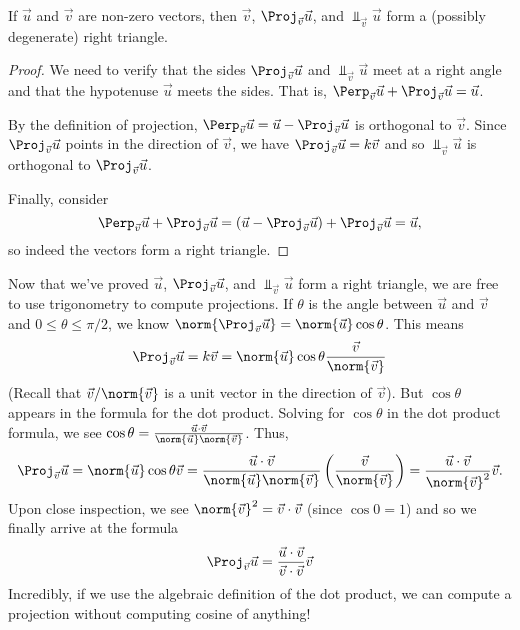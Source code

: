 \begin{theorem}
	If $\vec u$ and $\vec v$ are non-zero vectors, then $\vec v$, $\Proj_{\vec v}\vec u$,
	and $\Perp_{\vec v}\vec u$ form a (possibly degenerate) right triangle.
\end{theorem}
\begin{proof}
	We need to verify that the sides $\Proj_{\vec v}\vec u$ and $\Perp_{\vec v}\vec u$
	meet at a right angle and that the hypotenuse $\vec u$ meets the sides.  That is,
	$\Perp_{\vec v}\vec u+\Proj_{\vec v}\vec u=\vec u$.

	By the definition of projection, $\Perp_{\vec v}\vec u=\vec u-\Proj_{\vec v}\vec u$
	is orthogonal to $\vec v$.  Since $\Proj_{\vec v}\vec u$ points in the
	direction of $\vec v$, we have $\Proj_{\vec v}\vec u=k\vec v$ and so
	$\Perp_{\vec v}\vec u$ is orthogonal to $\Proj_{\vec v}\vec u$.

	Finally, consider
	\[
		\Perp_{\vec v}\vec u+\Proj_{\vec v}\vec u=
		(\vec u-\Proj_{\vec v}\vec u)+\Proj_{\vec v}\vec u=\vec u,
	\]
	so indeed the vectors form a right triangle.
\end{proof}

Now that we've proved $\vec u$, $\Proj_{\vec v}\vec u$,
and $\Perp_{\vec v}\vec u$ form a right triangle, we are free to use
trigonometry to compute projections.  If $\theta$ is the angle between $\vec u$
and $\vec v$ and $0\leq \theta\leq \pi/2$,
we know $\norm{\Proj_{\vec v}\vec u}=\norm{\vec u}\cos\theta$.  This means
\[
	\Proj_{\vec v}\vec u = k\vec v=\norm{\vec u}\cos\theta\frac{\vec v}{\norm{\vec v}}
\]
(Recall that $\vec v/\norm{\vec v}$ is a unit vector in the direction of $\vec v$).
But $\cos \theta$ appears in the formula for the dot product.  Solving for
$\cos\theta$ in the dot product formula, we see $\cos\theta=\frac{\vec u\cdot\vec v}{\norm{\vec u}\norm{\vec v}}$.
Thus,
\[
	\Proj_{\vec v}\vec u = \norm{\vec u}\cos\theta\vec v
	=\frac{\vec u\cdot \vec v}{\norm{\vec u}\norm{\vec v}}\left(\frac{\vec v}{\norm{\vec v}}\right)
	=\frac{\vec u\cdot \vec v}{\norm{\vec v}^2}\vec v.
\]
Upon close inspection, we see $\norm{\vec v}^2=\vec v\cdot \vec v$ (since $\cos 0=1$)
and so we finally arrive at the formula
\[
	\Proj_{\vec v}\vec u
	=\frac{\vec u\cdot \vec v}{\vec v\cdot \vec v}\vec v
\]
Incredibly, if we use the algebraic definition of the dot product, we can
compute a projection without computing cosine of anything!

